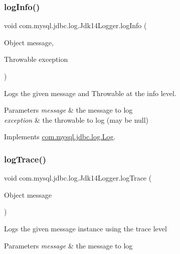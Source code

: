 \subsubsection{\texorpdfstring{log\+Info()}{logInfo()}\hspace{0.1cm}{\footnotesize\ttfamily [2/2]}}
{\footnotesize\ttfamily void com.\+mysql.\+jdbc.\+log.\+Jdk14\+Logger.\+log\+Info (\begin{DoxyParamCaption}\item[{Object}]{message,  }\item[{Throwable}]{exception }\end{DoxyParamCaption})}

Logs the given message and Throwable at the \textquotesingle{}info\textquotesingle{} level.


\begin{DoxyParams}{Parameters}
{\em message} & the message to log \\
\hline
{\em exception} & the throwable to log (may be null) \\
\hline
\end{DoxyParams}


Implements \mbox{\hyperlink{interfacecom_1_1mysql_1_1jdbc_1_1log_1_1_log_a577190d2919e07471dcd29d57eebee30}{com.\+mysql.\+jdbc.\+log.\+Log}}.

\mbox{\label{classcom_1_1mysql_1_1jdbc_1_1log_1_1_jdk14_logger_aca41ec6e1a9048dff00daed4ad32050b}} 
\subsubsection{\texorpdfstring{log\+Trace()}{logTrace()}\hspace{0.1cm}{\footnotesize\ttfamily [1/2]}}
{\footnotesize\ttfamily void com.\+mysql.\+jdbc.\+log.\+Jdk14\+Logger.\+log\+Trace (\begin{DoxyParamCaption}\item[{Object}]{message }\end{DoxyParamCaption})}

Logs the given message instance using the \textquotesingle{}trace\textquotesingle{} level


\begin{DoxyParams}{Parameters}
{\em message} & the message to log \\
\hline
\end{DoxyParams}


